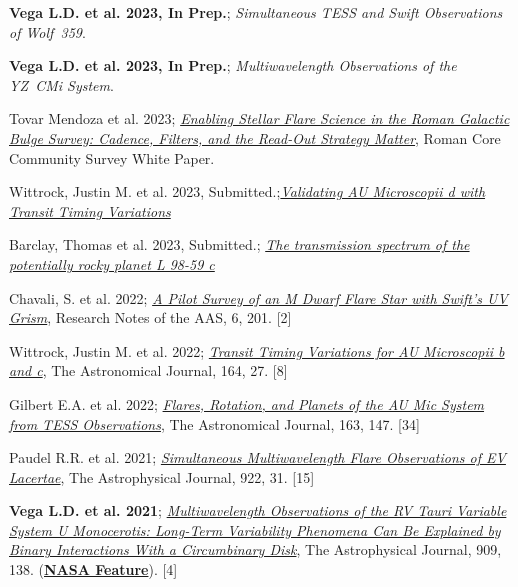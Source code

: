 \documentclass[letter,11pt]{article}
\begin{document}
\begin{etaremune}
\renewcommand\labelenumi{\bfseries\theenumi .}
\item {\bf Vega L.D. et al. 2023, In Prep.}; {\it Simultaneous TESS and Swift Observations of Wolf~359}.

\item {\bf Vega L.D. et al. 2023, In Prep.}; {\it Multiwavelength Observations of the YZ~CMi System}.

\item {Tovar Mendoza et al. 2023};
\href{https://ui.adsabs.harvard.edu/abs/2023arXiv230705806T/abstract}{\it Enabling Stellar Flare Science in the Roman Galactic Bulge Survey: Cadence, Filters, and the Read-Out Strategy Matter}, Roman Core Community Survey White Paper.

\item {Wittrock, Justin M. et al. 2023, Submitted.};\href{https://ui.adsabs.harvard.edu/abs/2023arXiv230204922W/abstract}{\it Validating AU Microscopii d with Transit Timing Variations}

\item {Barclay, Thomas et al. 2023,
Submitted.}; \href{https://ui.adsabs.harvard.edu/abs/2023arXiv230204922W/abstract}{\it The transmission spectrum of the potentially rocky planet L 98-59 c}

\item {Chavali, S. et al. 2022}; \href{https://ui.adsabs.harvard.edu/abs/2022RNAAS...6..201C/abstract}{\it A Pilot Survey of an M Dwarf Flare Star with Swift’s UV Grism}, Research Notes of the AAS, 6, 201. [2]

\item {Wittrock, Justin M. et al. 2022}; \href{https://ui.adsabs.harvard.edu/abs/2022AJ....164...27W/abstract}{\it Transit Timing Variations for AU Microscopii b and c}, The Astronomical Journal, 164, 27. [8]

\item Gilbert E.A. et al. 2022; \href{https://ui.adsabs.harvard.edu/abs/2022AJ....163..147G/abstract}{\it Flares, Rotation, and Planets of the AU Mic System from TESS Observations}, The Astronomical Journal, 163, 147. [34]

\item {Paudel R.R. et al. 2021}; 
\href{https://ui.adsabs.harvard.edu/abs/2021ApJ...922...31P/abstract}{\it Simultaneous Multiwavelength Flare Observations of EV Lacertae}, The Astrophysical Journal, 922, 31. [15]

\item {\bf Vega L.D. et al. 2021}; \href{https://ui.adsabs.harvard.edu/abs/2021ApJ...909..138V/abstract}{\it Multiwavelength Observations of the RV Tauri Variable System U Monocerotis: Long-Term Variability Phenomena Can Be Explained by Binary Interactions With a Circumbinary Disk}, The Astrophysical Journal, 909, 138. (\href{https://www.nasa.gov/feature/goddard/2021/scientists-sketch-aged-star-system-using-over-a-century-of-observations/}{\bf NASA Feature}). [4]


\end{etaremune}
\end{document}
